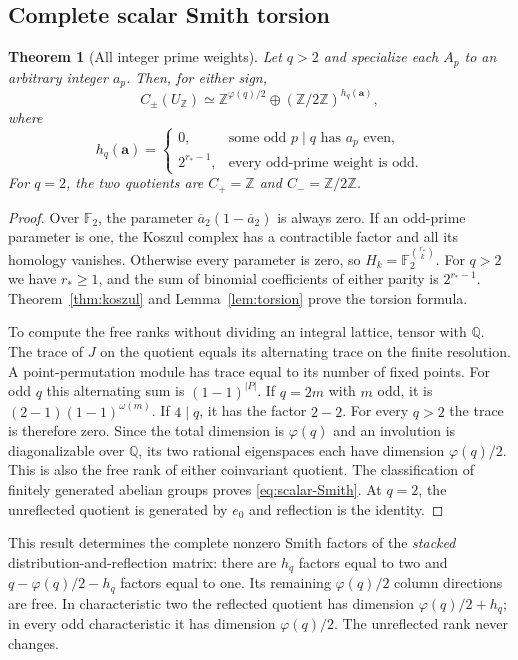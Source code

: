 \documentclass[11pt]{article}
\numberwithin{equation}{section}
\newtheorem{theorem}{Theorem}[section]
\theoremstyle{definition}
\theoremstyle{remark}
\newcommand{\Z}{\mathbb Z}
\newcommand{\Q}{\mathbb Q}
\newcommand{\F}{\mathbb{F}_2}
\begin{document}
\subsection{Complete scalar Smith torsion}
\begin{theorem}[All integer prime weights]
\label{thm:scalar-torsion}
Let $q>2$ and specialize each $A_p$ to an arbitrary integer $a_p$.
Then, for either sign,
\begin{equation}
 C_\pm(U_{\Z})\simeq
 \Z^{\varphi(q)/2}\oplus(\Z/2\Z)^{h_q(\boldsymbol a)},
 \label{eq:scalar-Smith}
\end{equation}
where
\begin{equation}
 h_q(\boldsymbol a)=
 \begin{cases}
 0,&\text{some odd }p\mid q\text{ has }a_p\text{ even},\\
 2^{r_*-1},&\text{every odd-prime weight is odd}.
 \end{cases}
 \label{eq:scalar-h}
\end{equation}
For $q=2$, the two quotients are $C_+=\Z$ and $C_-=\Z/2\Z$.
\end{theorem}
\begin{proof}
Over $\F$, the parameter $\overline a_2(1-\overline a_2)$ is always zero.
If an odd-prime parameter is one, the Koszul complex has a contractible
factor and all its homology vanishes. Otherwise every parameter is zero,
so $H_k=\F^{\binom{r_*}{k}}$. For $q>2$ we have $r_*\ge1$, and the sum
of binomial coefficients of either parity is $2^{r_*-1}$.
Theorem~\ref{thm:koszul} and Lemma~\ref{lem:torsion} prove the torsion
formula.

To compute the free ranks without dividing an integral lattice, tensor
with $\Q$. The trace of $J$ on the quotient equals its alternating trace
on the finite resolution. A point-permutation module has trace equal
to its number of fixed points. For odd $q$ this alternating sum is
$(1-1)^{|P|}$. If $q=2m$ with $m$ odd, it is
$(2-1)(1-1)^{\omega(m)}$. If $4\mid q$, it has the factor $2-2$.
For every $q>2$ the trace is therefore zero. Since the total dimension is
$\varphi(q)$ and an involution is diagonalizable over $\Q$, its two
rational eigenspaces each have dimension $\varphi(q)/2$.
This is also the free rank of either coinvariant quotient. The
classification of finitely generated abelian groups proves
\eqref{eq:scalar-Smith}. At $q=2$, the unreflected quotient is generated
by $e_0$ and reflection is the identity.
\end{proof}

This result determines the complete nonzero Smith factors of the
\emph{stacked} distribution-and-reflection matrix: there are
$h_q$ factors equal to two and
$q-\varphi(q)/2-h_q$ factors equal to one. Its remaining
$\varphi(q)/2$ column directions are free. In characteristic two the
reflected quotient has dimension $\varphi(q)/2+h_q$; in every odd
characteristic it has dimension $\varphi(q)/2$.
The unreflected rank never changes.
\end{document}
